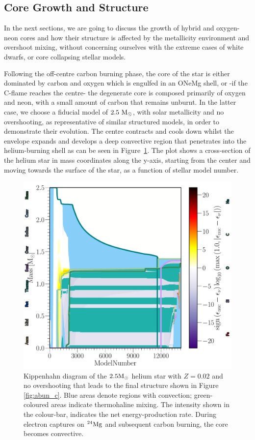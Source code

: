 \documentclass[../../main/thesis_msc.tex]{subfiles}
\begin{document}
    \subsection{Core Growth and Structure} \label{sec:coreGrowth}
    
    In the next sections, we are going to discuss the growth of hybrid and oxygen-neon cores and how their structure is affected by the metallicity environment and overshoot mixing, without concerning ourselves with the extreme cases of white dwarfs, or core collapsing stellar models.
    
    Following the off-centre carbon burning phase, the core of the star is either dominated by carbon and oxygen which is engulfed in an ONeMg shell, or -if the C-flame reaches the centre- the degenerate core is composed primarily of oxygen and neon, with a small amount of carbon that remains unburnt. In the latter case, we choose a fiducial model of $\rm 2.5 \ M_{\odot}$, with solar metallicity and no overshooting, as representative of similar structured models, in order to demonstrate their evolution. The centre contracts and cools down whilst the envelope expands and develops a deep convective region that penetrates into the helium-burning shell as can be seen in Figure\, \ref{fig:Kipp}. The plot shows a cross-section of the helium star in mass coordinates along the y-axis, starting from the center and moving towards the surface of the star, as a function of stellar model number.
    
    
    
    \begin{figure}[t]
        \centering
        \includegraphics[width=0.5\columnwidth]{../figures/chapter4/Kipp_2p5_0p02_0p0.pdf}
        \caption{Kippenhahn diagram of the $2.5 \rm M_{\odot}$ helium star with $Z = 0.02$ and no overshooting that leads to the final structure shown in Figure \ref{fig:abun_c}. Blue areas denote regions with convection; green-coloured areas indicate thermohaline mixing. The intensity shown in the colour-bar, indicates the net energy-production rate. During electron captures on $\rm ^{24}Mg$ and subsequent carbon burning, the core becomes convective.}
        \label{fig:Kipp}
    \end{figure}
    
\end{document}
